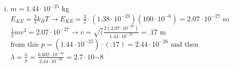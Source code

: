 \documentclass[ps1.tex]{subfiles}
\begin{document}
\begin{enumerate}[(a)]
\begin{enumerate}[i.]
\item $m = 1.44\cdot10^{-25}$ kg\\
$E_{KE} = \frac {3}{2}k_BT \rightarrow E_{KE} = \frac {3}{2}\cdot(1.38\cdot10^{-23})(100\cdot10^{-6}) = 2.07\cdot 10^{-27}$
so $\frac{1}{2}mv^2 = 2.07\cdot 10^{-27} \rightarrow v = \sqrt(\frac {2(2.07\cdot 10^{-27})}{1.44\cdot10^{-25}} = .17$ m\\
from this $p = (1.44\cdot10^{-25})\cdot(.17) = 2.44\cdot10^{-26}$ and then \\
$\lambda = \frac {h}{p} = \frac {6.602\cdot10^{-34}} {2.44\cdot10^{-26}} = 2.7\cdot10{-8}$\\

\end{enumerate}
\end{enumerate}

\noindent\makebox[\linewidth]{\rule{\paperwidth}{0.4pt}}
\end{document}
